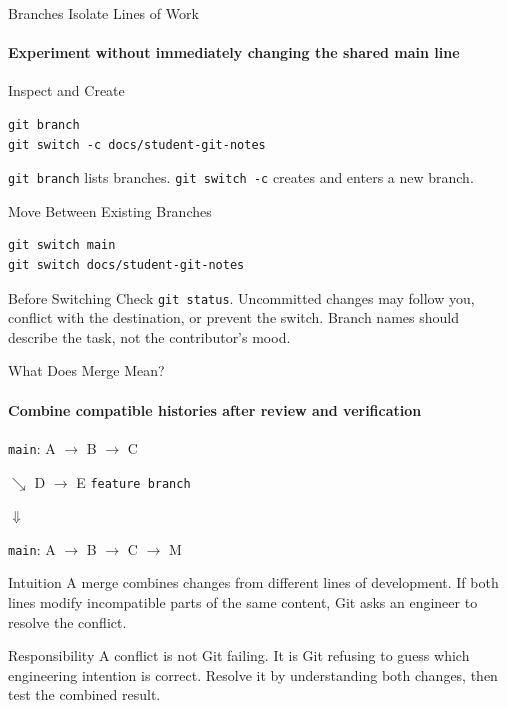 \begin{frame}[fragile]{Branches Isolate Lines of Work}
\framesubtitle{Experiment without immediately changing the shared main line}
\footnotesize
\begin{block}{Inspect and Create}
\begin{verbatim}
git branch
git switch -c docs/student-git-notes
\end{verbatim}
\texttt{git branch} lists branches. \texttt{git switch -c} creates and enters a new branch.
\end{block}
\begin{exampleblock}{Move Between Existing Branches}
\begin{verbatim}
git switch main
git switch docs/student-git-notes
\end{verbatim}
\end{exampleblock}
\begin{alertblock}{Before Switching}
Check \texttt{git status}. Uncommitted changes may follow you, conflict with the destination, or prevent the switch. Branch names should describe the task, not the contributor's mood.
\end{alertblock}
\end{frame}

\begin{frame}{What Does Merge Mean?}
\framesubtitle{Combine compatible histories after review and verification}
\footnotesize
\begin{center}
\texttt{main}: A $\longrightarrow$ B $\longrightarrow$ C

\vspace{0.15cm}
\hspace{1.0cm}$\searrow$ D $\longrightarrow$ E \quad \texttt{feature branch}

\vspace{0.15cm}
$\Downarrow$

\texttt{main}: A $\longrightarrow$ B $\longrightarrow$ C $\longrightarrow$ M
\end{center}
\begin{block}{Intuition}
A merge combines changes from different lines of development. If both lines modify incompatible parts of the same content, Git asks an engineer to resolve the conflict.
\end{block}
\begin{alertblock}{Responsibility}
A conflict is not Git failing. It is Git refusing to guess which engineering intention is correct. Resolve it by understanding both changes, then test the combined result.
\end{alertblock}
\end{frame}

